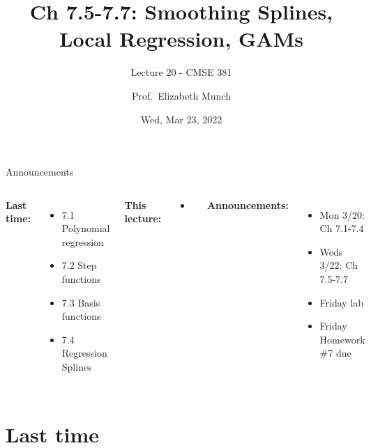 \documentclass[aspectratio=169,usenames,dvipsnames]{beamer}
\begin{document}
\title[]{Ch 7.5-7.7: Smoothing Splines, Local Regression, GAMs}
\subtitle{Lecture 20 - CMSE 381}
\date{Wed, Mar 23, 2022}



\author[Dr.~Munch]{Prof.~Elizabeth Munch}

\begin{frame}
 \titlepage


\end{frame}
\begin{frame}[c]{Announcements}

\begin{columns}
\centering

	\textbf{Last time:}
	\begin{itemize}
		\item 7.1 Polynomial regression
		\item 7.2 Step functions
		\item 7.3 Basis functions
		\item 7.4 Regression Splines
	\end{itemize}

	\vspace{.2in}

	\textbf{This lecture:}
	\begin{itemize}
	\item
\end{itemize}


\centering

\textbf{Announcements:}
	\begin{itemize}
		\item Mon 3/20: Ch 7.1-7.4
		\item Weds 3/22: Ch 7.5-7.7
		\item Friday lab
		\item Friday Homework \#7 due

	\end{itemize}
\end{columns}

\end{frame}



\section{Last time}
\end{document}
